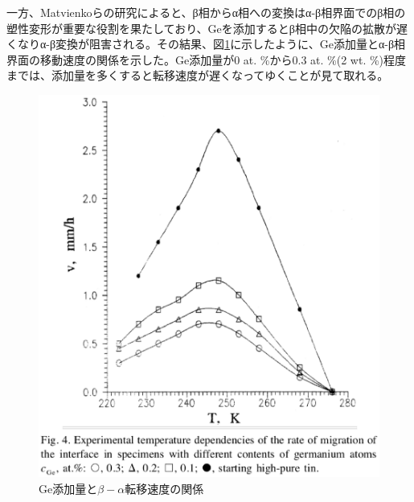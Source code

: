 一方、Matvienkoらの研究\cite{Matvienko}によると、β相からα相への変換はα-β相界面でのβ相の塑性変形が重要な役割を果たしており、Geを添加するとβ相中の欠陥の拡散が遅くなりα-β変換が阻害される。その結果、図\ref{fig:Ge_content}に示したように、Ge添加量とα-β相界面の移動速度の関係を示した\cite{Matvienko}。Ge添加量が0 at. \%から0.3 at. \%(2 wt. \%)程度までは、添加量を多くすると転移速度が遅くなってゆくことが見て取れる。
\begin{figure}[htb]
    \begin{center}
   \includegraphics[width=130mm]{Introduction/Ge_content.eps}
  \end{center}
  \caption{Ge添加量と$\beta-\alpha$転移速度の関係\cite{Matvienko}}
  \label{fig:Ge_content}
\end{figure}

\newpage
